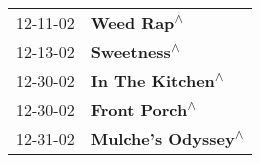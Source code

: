 \begin{supertabular}{p{0.25\columnwidth}p{0.75\columnwidth}}
 12-11-02 &                                                                 \textbf{Weed Rap\textsuperscript{$\wedge$}} \\
 12-13-02 &                                                                \textbf{Sweetness\textsuperscript{$\wedge$}} \\
 12-30-02 &                                                           \textbf{In The Kitchen\textsuperscript{$\wedge$}} \\
 12-30-02 &                                                              \textbf{Front Porch\textsuperscript{$\wedge$}} \\
 12-31-02 &                                                         \textbf{Mulche's Odyssey\textsuperscript{$\wedge$}} \\
\end{supertabular}
